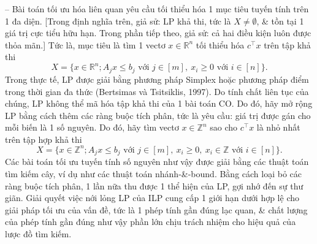\documentclass{article}
\begin{document}
\begin{itemize}
\begin{itemize}
\begin{itemize}
            -- Bài toán tối ưu hóa liên quan yêu cầu tối thiểu hóa 1 mục tiêu tuyến tính trên 1 đa diện. [Trong định nghĩa trên, giả sử: LP khả thi, tức là $X\ne\emptyset$, \& tồn tại 1 giá trị cực tiểu hữu hạn. Trong phần tiếp theo, giả sử: cả hai điều kiện luôn được thỏa mãn.] Tức là, mục tiêu là tìm 1 vectơ $x\in\mathbb{R}^n$ tối thiểu hóa $c^\top x$ trên tập khả thi
            \begin{equation*}
                X = \{x\in\mathbb{R}^n;A_jx\le b_j\mbox{ với } j\in[m],\ x_i\ge0\mbox{ với } i\in[n]\}.
            \end{equation*}
            Trong thực tế, LP được giải bằng phương pháp Simplex hoặc phương pháp điểm trong thời gian đa thức (Bertsimas và Tsitsiklis, 1997). Do tính chất liên tục của chúng, LP không thể mã hóa tập khả thi của 1 bài toán CO. Do đó, hãy mở rộng LP bằng cách thêm các ràng buộc tích phân, tức là yêu cầu: giá trị được gán cho mỗi biến là 1 số nguyên. Do đó, hãy tìm vectơ $x\in\mathbb{Z}^n$ sao cho $c^\top x$ là nhỏ nhất trên tập hợp khả thi
            \begin{equation*}
                X = \{x\in\mathbb{Z}^n;A_jx\le b_j\mbox{ với } j\in[m],\ x_i\ge0,\ x_i\in\mathbb{Z}\mbox{ với } i\in[n]\}.
            \end{equation*}
            Các bài toán tối ưu tuyến tính số nguyên như vậy được giải bằng các thuật toán tìm kiếm cây, ví dụ như các thuật toán nhánh-\&-bound. Bằng cách loại bỏ các ràng buộc tích phân, 1 lần nữa thu được 1 thể hiện của LP, gợi nhớ đến sự thư giãn. Giải quyết việc nới lỏng LP của ILP cung cấp 1 giới hạn dưới hợp lệ cho giải pháp tối ưu của vấn đề, tức là 1 phép tính gần đúng lạc quan, \& chất lượng của phép tính gần đúng như vậy phần lớn chịu trách nhiệm cho hiệu quả của lược đồ tìm kiếm.


\end{itemize}
\end{itemize}
\end{itemize}
\end{document}
